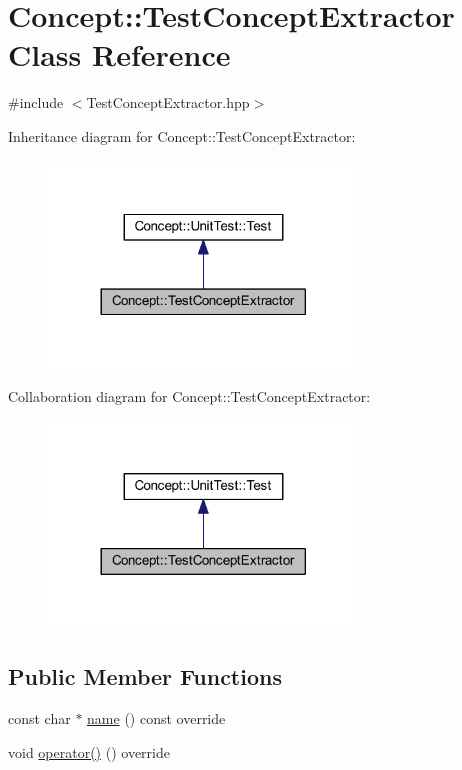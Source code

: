 \hypertarget{class_concept_1_1_test_concept_extractor}{}\section{Concept\+::Test\+Concept\+Extractor Class Reference}
\label{class_concept_1_1_test_concept_extractor}


{\ttfamily \#include $<$Test\+Concept\+Extractor.\+hpp$>$}



Inheritance diagram for Concept\+::Test\+Concept\+Extractor\+:\nopagebreak
\begin{figure}[H]
\begin{center}
\leavevmode
\includegraphics[width=233pt]{class_concept_1_1_test_concept_extractor__inherit__graph}
\end{center}
\end{figure}


Collaboration diagram for Concept\+::Test\+Concept\+Extractor\+:\nopagebreak
\begin{figure}[H]
\begin{center}
\leavevmode
\includegraphics[width=233pt]{class_concept_1_1_test_concept_extractor__coll__graph}
\end{center}
\end{figure}
\subsection*{Public Member Functions}
\begin{DoxyCompactItemize}
\item 
const char $\ast$ \mbox{\hyperlink{class_concept_1_1_test_concept_extractor_a6b957e2b9689545c23e800e67e33196a}{name}} () const override
\item 
void \mbox{\hyperlink{class_concept_1_1_test_concept_extractor_a32d377bd7d03420a7f470a840cd654cc}{operator()}} () override
\end{DoxyCompactItemize}
